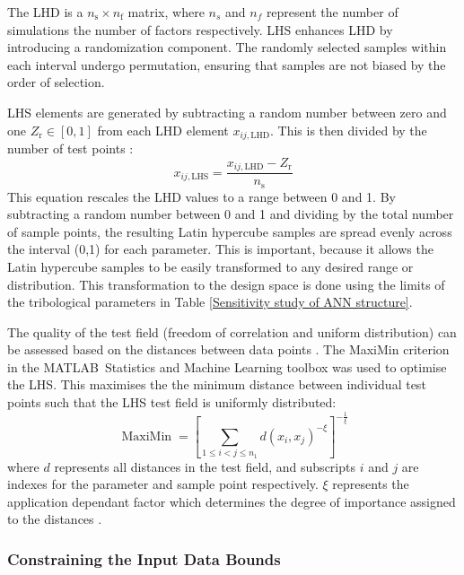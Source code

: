 The LHD is a $n_{\mathrm{s}} \times n_{\mathrm{f}}$ matrix, where $n_s$ and $n_f$ represent the number of simulations the number of factors respectively. LHS enhances LHD by introducing a randomization component. The randomly selected samples within each interval undergo permutation, ensuring that samples are not biased by the order of selection.

LHS elements are generated by subtracting a random number between zero and one $Z_{\mathrm{r}}\in[0,1]$ from each LHD element $x_{i j, \mathrm{LHD}}$. This is then divided by the number of test points \cite{Siebertz2010}:
\begin{equation}\label{LHS}
	x_{i j, \mathrm{LHS}}=\frac{x_{i j, \mathrm{LHD}}-Z_{\mathrm{r}}}{n_{\mathrm{s}}}
\end{equation}
This equation rescales the LHD values to a range between 0 and 1. By subtracting a random number between 0 and 1 and dividing by the total number of sample points, the resulting Latin hypercube samples are spread evenly across the interval (0,1) for each parameter. This is important, because it allows the Latin hypercube samples to be easily transformed to any desired range or distribution. This transformation to the design space is done using the limits of the tribological parameters in Table \ref{Sensitivity study of ANN structure}.

The quality of the test field (freedom of correlation and uniform distribution) can be assessed based on the distances between data points \cite{Johnson1990}. The MaxiMin criterion in the MATLAB\textregistered\ Statistics and Machine Learning toolbox was used to optimise the LHS. This maximises the the minimum distance between individual test points such that the LHS test field is uniformly distributed:
\begin{equation}\label{maximin}
	\operatorname{MaxiMin}=\left[\sum_{1 \leq i<j \leq n_1} d\left(x_i, x_j\right)^{-\xi}\right]^{-\frac{1}{\xi}}
\end{equation}
where $d$ represents all distances in the test field, and subscripts $i$ and $j$ are indexes for the parameter and sample point respectively. $\xi$ represents the application dependant factor which determines the degree of importance assigned to the distances \cite{Siebertz2010}.

\subsubsection{Constraining the Input Data Bounds}

